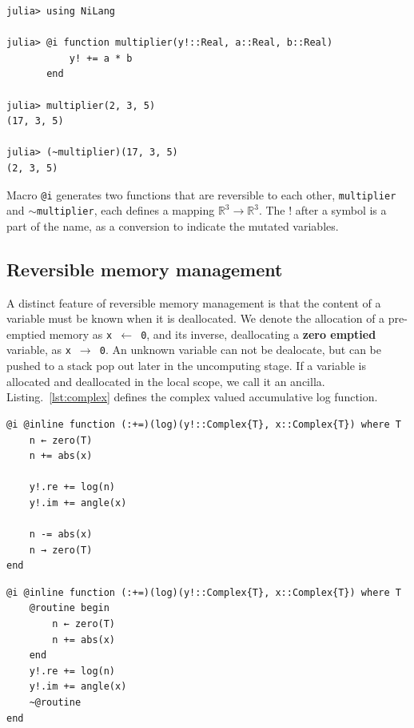 \documentclass{article}
\newcommand{\<}{\langle}
\renewcommand{\>}{\rangle}
\newcommand{\Lst}[1]{Listing.~\ref{#1}}
\theoremstyle{definition}\newtheorem{definition}{\textit{Definition}}
\begin{document}
\begin{minipage}{.88\columnwidth}
\begin{lstlisting}[mathescape=true,caption={A reversible multiplier},label={lst:multiplier}]
julia> using NiLang

julia> @i function multiplier(y!::Real, a::Real, b::Real)
           y! += a * b
       end

julia> multiplier(2, 3, 5)
(17, 3, 5)

julia> (~multiplier)(17, 3, 5)
(2, 3, 5)
\end{lstlisting}
\end{minipage}

Macro \texttt{@i} generates two functions that are reversible to each other, \texttt{multiplier} and \texttt{$\sim$multiplier}, each defines a mapping $\mathbb{R}^3 \rightarrow \mathbb{R}^3$. The $!$ after a symbol is a part of the name, as a conversion to indicate the mutated variables.

\subsection{Reversible memory management}
A distinct feature of reversible memory management is that the content of a variable must be known when it is deallocated.
We denote the allocation of a pre-emptied memory as \texttt{x $\leftarrow$ 0}, and its inverse, deallocating a \textbf{zero emptied} variable, as \texttt{x $\rightarrow$ 0}.
An unknown variable can not be dealocate, but can be pushed to a stack pop out later in the uncomputing stage.
If a variable is allocated and deallocated in the local scope, we call it an ancilla.
\Lst{lst:complex} defines the complex valued accumulative log function.

\begin{minipage}{.45\columnwidth}
\begin{lstlisting}[mathescape=true,caption={Reversible complex valued log function $y\mathrel{+}=\log(|x|) + i{\rm Arg}(x)$.},label={lst:complex}]
@i @inline function (:+=)(log)(y!::Complex{T}, x::Complex{T}) where T
    n ← zero(T)
    n += abs(x)

    y!.re += log(n)
    y!.im += angle(x)

    n -= abs(x)
    n → zero(T)
end
\end{lstlisting}
\end{minipage}\hfill
\begin{minipage}{.45\columnwidth}
    \begin{lstlisting}[mathescape=true,caption={Compute-copy-uncompute version of \Lst{lst:complex}},label={lst:complex2}]
@i @inline function (:+=)(log)(y!::Complex{T}, x::Complex{T}) where T
    @routine begin
        n ← zero(T)
        n += abs(x)
    end
    y!.re += log(n)
    y!.im += angle(x)
    ~@routine
end
\end{lstlisting}
\end{minipage}
\end{document}
